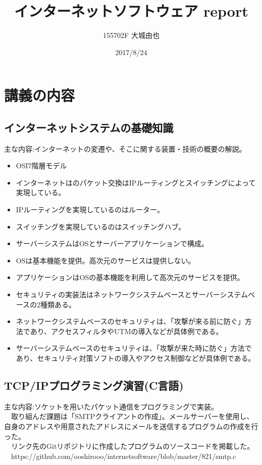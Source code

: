 \documentclass[11pt,a4paper]{jsarticle}
\begin{document}
\title{インターネットソフトウェア report}
\author{155702F 大城由也}
\date{2017/8/24}

\maketitle
\newpage
\section*{講義の内容}
\subsection*{インターネットシステムの基礎知識}
主な内容:インターネットの変遷や、そこに関する装置・技術の概要の解説。
\begin{itemize}
\item OSI7階層モデル
\item インターネットはのパケット交換はIPルーティングとスイッチングによって実現している。
\item IPルーティングを実現しているのはルーター。
\item スイッチングを実現しているのはスイッチングハブ。
\item サーバーシステムはOSとサーバーアプリケーションで構成。
\item OSは基本機能を提供。高次元のサービスは提供しない。
\item アプリケーションはOSの基本機能を利用して高次元のサービスを提供。
\item セキュリティの実装法はネットワークシステムベースとサーバーシステムベースの2種類ある。
\item ネットワークシステムベースのセキュリティは、「攻撃が来る前に防ぐ」方法であり、アクセスフィルタやUTMの導入などが具体例である。
\item サーバーシステムベースのセキュリティは、「攻撃が来た時に防ぐ」方法であり、セキュリティ対策ソフトの導入やアクセス制御などが具体例である。
\end{itemize}


\subsection*{TCP/IPプログラミング演習(C言語)}
主な内容:ソケットを用いたパケット通信をプログラミングで実装。\\
　取り組んだ課題は「SMTPクライアントの作成」。メールサーバーを使用し、自身のアドレスや用意されたアドレスにメールを送信するプログラムの作成を行った。\\
　リンク先のGitリポジトリに作成したプログラムのソースコードを掲載した。\\
　https://github.com/ooshirooo/internetsoftware/blob/master/821/smtp.c
\end{document}
